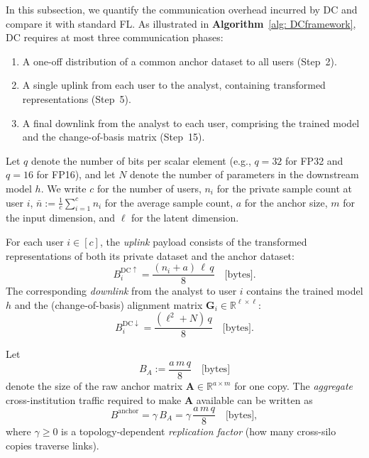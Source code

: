 \documentclass[final,3p,times]{elsarticle}
\theoremstyle{plain}
\newcommand{\matr}[1]{\bm{#1}}        %
\begin{document}
In this subsection, we quantify the communication overhead incurred by DC and compare it with standard FL. As illustrated in \textbf{Algorithm}~\ref{alg: DCframework}, DC requires at most three communication phases:
\begin{enumerate}
    \item A one-off distribution of a common anchor dataset to all users (Step~2).
    \item A single uplink from each user to the analyst, containing transformed representations (Step~5).
    \item A final downlink from the analyst to each user, comprising the trained model and the change-of-basis matrix (Step~15).
\end{enumerate}

Let \(q\) denote the number of bits per scalar element (e.g., \(q{=}32\) for FP32 and \(q{=}16\) for FP16), and let \(N\) denote the number of parameters in the downstream model \(h\). We write \(c\) for the number of users, \(n_i\) for the private sample count at user \(i\), \(\bar n := \frac{1}{c}\sum_{i=1}^c n_i\) for the average sample count, \(a\) for the anchor size, \(m\) for the input dimension, and \(\ell\) for the latent dimension.

For each user \(i\in[c]\), the \emph{uplink} payload consists of the transformed representations of both its private
dataset and the anchor dataset:
\begin{equation}
    B^{\mathrm{DC}\uparrow}_{i} = \frac{(n_i+a)\,\ell\,q}{8}
    \quad\text{[bytes]}.
    \label{eq:dc-uplink}
\end{equation}
The corresponding \emph{downlink} from the analyst to user \(i\) contains the trained model \(h\) and the (change-of-basis) alignment matrix \(\matr{G}_i \in \mathbb{R}^{\ell\times \ell}\):
\begin{equation}
    B^{\mathrm{DC}\downarrow}_{i} = \frac{(\ell^{2}+N)\,q}{8}
    \quad\text{[bytes]}.
    \label{eq:dc-downlink}
\end{equation}

Let
\begin{equation}
    B_A := \frac{a\,m\,q}{8}\quad\text{[bytes]}
    \label{eq:anchor-onecopy}
\end{equation}
denote the size of the raw anchor matrix \(\matr{A}\in\mathbb{R}^{a\times m}\) for one copy. The \emph{aggregate} cross-institution traffic required to make \(\matr{A}\) available can be written as
\begin{equation}
    B^{\mathrm{anchor}} = \gamma\,B_A = \gamma\,\frac{a\,m\,q}{8}
    \quad\text{[bytes]},
    \label{eq:anchor}
\end{equation}
where \(\gamma\ge 0\) is a topology-dependent \emph{replication factor} (how many cross-silo copies traverse links).
\end{document}
